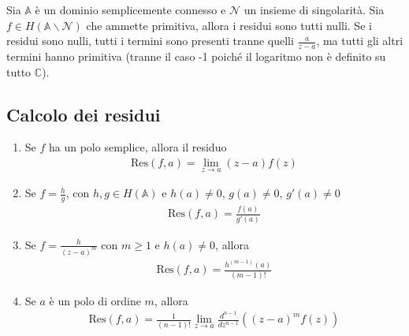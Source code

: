 \documentclass[a4paper, oneside]{article}
\begin{document}
\begin{corollary}
    Sia $\mathbb{A}$ è un dominio semplicemente connesso e $\mathcal{N}$ un insieme di singolarità. 
    Sia $f \in H(\mathbb{A} \backslash \mathcal{N})$ che ammette primitiva, allora i residui sono tutti nulli. Se i residui sono 
    nulli, tutti i termini sono presenti tranne quelli $\frac{a}{z - a}$, ma tutti gli altri termini hanno primitiva (tranne il caso -1
    poiché il logaritmo non è definito su tutto $\mathbb{C}$).
\end{corollary}

\subsection{Calcolo dei residui}
\begin{enumerate}
    \item Se $f$ ha un polo semplice, allora il residuo 
    \begin{gather*}
        \text{Res}(f, a) = \lim_{z \to a} (z - a) f(z) 
    \end{gather*}
    \item Se $f = \frac{h}{g}$, con $h, g \in H(\mathbb{A})$ e $h(a) \neq 0$, $g(a) \neq 0$, $g'(a) \neq 0$
    \begin{align}
        \text{Res}(f, a) = \frac{f(a)}{g'(a)}
    \end{align}
    \item Se $f = \frac{h}{(z - a)^{m}}$ con $m \geq 1$ e $h(a)\neq 0$, allora 
    \begin{align}
        \text{Res}(f, a) = \frac{h^{(m - 1)}(a)}{(m - 1)!}
    \end{align}
    \item Se $a$ è un polo di ordine $m$, allora 
    \begin{align}
        \text{Res}(f, a) = \frac{1}{(n - 1)!} \lim_{z \to a} \frac{d^{n - 1}}{dz^{ n - 1}} \left((z - a)^{m}f(z)\right) 
    \end{align}
\end{enumerate}
\end{document}
